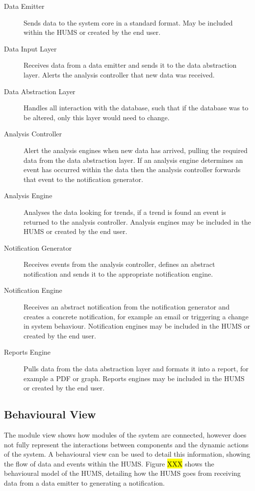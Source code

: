 \begin{description}
\item[Data Emitter]  Sends data to the system core in a standard format. May be included within the HUMS or created by the end user.
\item[Data Input Layer] Receives data from a data emitter and sends it to the data abstraction layer. Alerts the analysis controller that new data was received.
\item[Data Abstraction Layer] Handles all interaction with the database, such that if the database was to be altered, only this layer would need to change.
\item[Analysis Controller] Alert the analysis engines when new data has arrived, pulling the required data from the data abstraction layer. If an analysis engine determines an event has occurred within the data then the analysis controller forwards that event to the notification generator.
 \item[Analysis Engine] Analyses the data looking for trends, if a trend is found an event is returned to the analysis controller. Analysis engines may be included in the HUMS or created by the end user.
 \item[Notification Generator] Receives events from the analysis controller, defines an abstract notification and sends it to the appropriate notification engine.
 \item[Notification Engine] Receives an abstract notification from the notification generator and creates a concrete notification, for example an email or triggering a change in system behaviour. Notification engines may be included in the HUMS or created by the end user.
  \item[Reports Engine] Pulls data from the data abstraction layer and formats it into a report, for example a PDF or graph. Reports engines may be included in the HUMS or created by the end user.
\end{description}

\subsection{Behavioural View}
\label{sec:architecture-behaviouralview}

The module view shows how modules of the system are connected, however does not fully represent the interactions between components and the dynamic actions of the system.
A behavioural view can be used to detail this information, showing the flow of data and events within the HUMS. Figure \hl{XXX} shows the behavioural model of the HUMS, detailing how the HUMS goes from receiving data from a data emitter to generating a notification.

